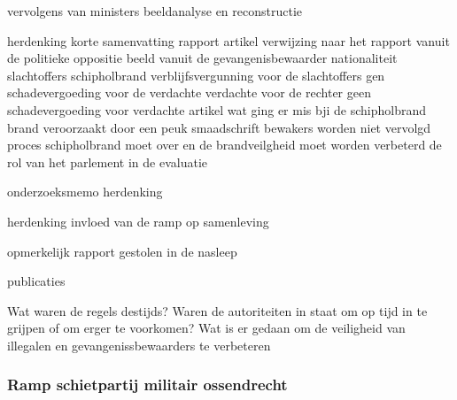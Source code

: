vervolgens van ministers
beeldanalyse en reconstructie

\cite{eenvandaagschipholbrand}
herdenking
korte samenvatting
rapport
artikel
verwijzing naar het rapport vanuit de politieke oppositie
beeld vanuit de gevangenisbewaarder
nationaliteit slachtoffers schipholbrand
verblijfsvergunning voor de slachtoffers
gen schadevergoeding voor de verdachte
verdachte voor de rechter
geen schadevergoeding voor verdachte
artikel wat ging er mis bji de schipholbrand
brand veroorzaakt door een peuk
smaadschrift
bewakers worden niet vervolgd
proces schipholbrand moet over en de brandveilgheid moet worden verbeterd
de rol van het parlement in de evaluatie

\cite{parlementairemonitorschipholbrand}
onderzoeksmemo
herdenking

herdenking
invloed van de ramp op samenleving

\cite{videonpoNOVA13112008}
opmerkelijk rapport gestolen in de nasleep

\cite{rizoomes01052014schipholbrand}


publicaties

\cite{heuvelkroesschipholbrandcamerabeelden}
Wat waren de regels destijds?
Waren de autoriteiten in staat om op tijd in te grijpen of om erger te voorkomen?
Wat is er gedaan om de veiligheid van illegalen en gevangenissbewaarders te verbeteren

\subsubsection{Ramp schietpartij militair ossendrecht }

